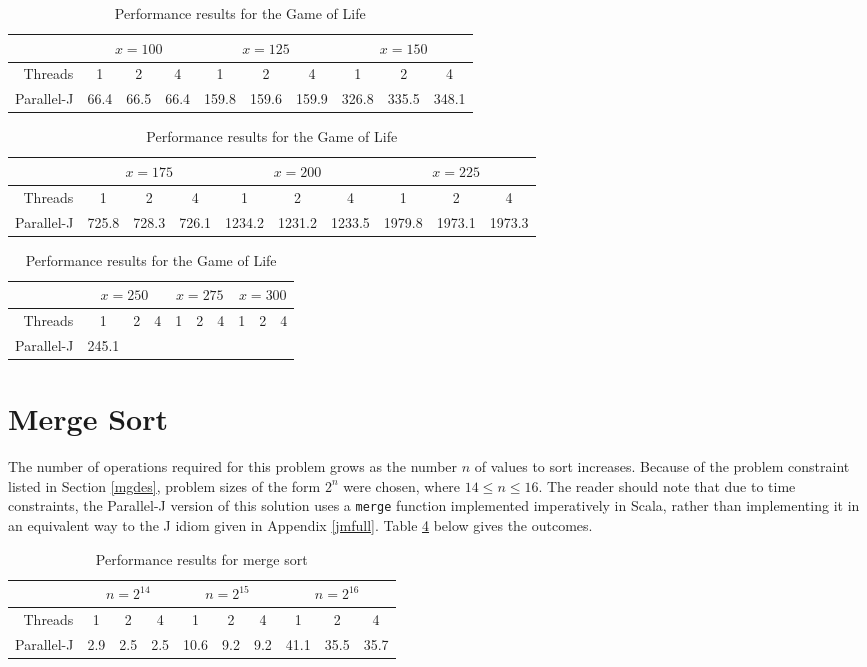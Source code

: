 \begin{table}[htbp]
\begin{tabular}{|r||c|c|c||c|c|c||c|c|c||}
	\hline
		& \multicolumn{3}{|c|}{$x=100$} & \multicolumn{3}{|c|}{$x=125$} & \multicolumn{3}{|c|}{$x=150$} \\
	\hline
		Threads & 1 & 2 & 4 & 1 & 2 & 4 & 1 & 2 & 4 \\
	\hline
	\hline
		Parallel-J & 66.4 & 66.5 & 66.4 & 159.8 & 159.6 & 159.9 & 326.8 & 335.5 & 348.1 \\
	\hline
\end{tabular}
\begin{tabular}{|r||c|c|c||c|c|c||c|c|c||}
	\hline
		& \multicolumn{3}{|c|}{$x=175$} & \multicolumn{3}{|c|}{$x=200$} & \multicolumn{3}{|c|}{$x=225$} \\
	\hline
		Threads & 1 & 2 & 4 & 1 & 2 & 4 & 1 & 2 & 4 \\
	\hline
	\hline
		Parallel-J & 725.8 & 728.3 & 726.1 & 1234.2 & 1231.2 & 1233.5 & 1979.8 & 1973.1 & 1973.3 \\
	\hline
\end{tabular}
\begin{tabular}{|r||c|c|c||c|c|c||c|c|c||}
	\hline
		& \multicolumn{3}{|c|}{$x=250$} & \multicolumn{3}{|c|}{$x=275$} & \multicolumn{3}{|c|}{$x=300$} \\
	\hline
		Threads & 1 & 2 & 4 & 1 & 2 & 4 & 1 & 2 & 4 \\
	\hline
	\hline
		Parallel-J & 245.1 & & & & & & & & \\
	\hline
\end{tabular}
\caption{Performance results for the Game of Life}
\label{tgol}
\end{table}

\section{Merge Sort}
The number of operations required for this problem 
grows as the number $n$ of values to sort increases. 
Because of the problem constraint listed in Section \ref{mgdes}, 
problem sizes of the form $2^n$ were chosen, 
where $14 \le n \le 16$. 
The reader should note that due to time constraints, 
the Parallel-J version of this solution uses a \texttt{merge} function 
implemented imperatively in Scala, rather than 
implementing it in an equivalent way to the J idiom given in Appendix \ref{jmfull}.
Table \ref{tmrg} below gives the outcomes.

\begin{table}[htbp]
\begin{tabular}{|r||c|c|c||c|c|c||c|c|c||}
	\hline
		& \multicolumn{3}{|c|}{$n=2^{14}$} & \multicolumn{3}{|c|}{$n=2^{15}$}& \multicolumn{3}{|c|}{$n=2^{16}$} \\
	\hline
		Threads & 1 & 2 & 4 & 1 & 2 & 4 & 1 & 2 & 4 \\
	\hline
	\hline
		Parallel-J & 2.9 & 2.5 & 2.5 & 10.6 & 9.2 & 9.2 & 41.1 & 35.5 & 35.7 \\
	\hline
\end{tabular}
\caption{Performance results for merge sort}
\label{tmrg}
\end{table}
